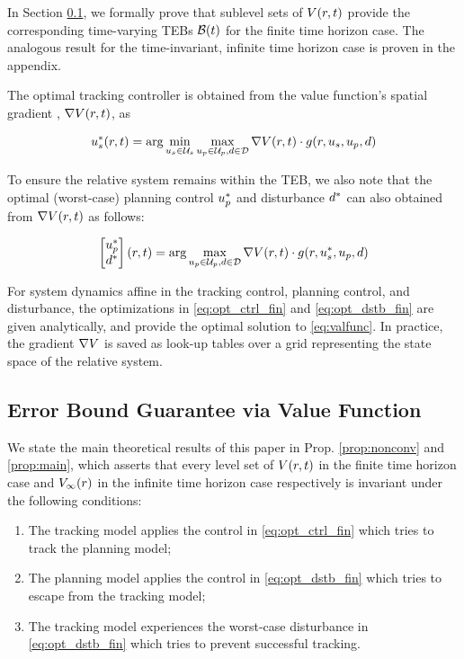 In Section \ref{sec:proofs}, we formally prove that sublevel sets of $V(r,t)$ provide the corresponding time-varying TEBs $\mathcal B(t)$ for the finite time horizon case.
The analogous result for the time-invariant, infinite time horizon case is proven in the appendix.

The optimal tracking controller is obtained from the value function's spatial gradient \cite{Mitchell05, Fisac15, Chen2018}, $\nabla V(r, t)$, as

\begin{align} \label{eq:opt_ctrl_fin}
\tctrl^*(\rstate, \tvar) = \arg\min_{\tctrl\in\tcset} \max_{\pctrl\in\pcset, \dstb\in\dset} \nabla\valfunc(\rstate, \tvar) \cdot \rdyn(\rstate,\tctrl,\pctrl,\dstb)
\end{align}

To ensure the relative system remains within the TEB, we also note that the optimal (worst-case) planning control $u_p^*$ and disturbance $d^*$ can also obtained from $\nabla V(r, t)$ as follows:

\begin{align} \label{eq:opt_dstb_fin}
\begin{bmatrix}
  \pctrl^* \\
  \dstb^*
\end{bmatrix} (\rstate, \tvar) = \arg \max_{\pctrl\in\pcset, \dstb\in\dset} \nabla\valfunc(\rstate, \tvar) \cdot \rdyn(\rstate,\tctrl^*,\pctrl,\dstb)
\end{align}

For system dynamics affine in the tracking control, planning control, and disturbance, the optimizations in \eqref{eq:opt_ctrl_fin} and \eqref{eq:opt_dstb_fin} are given analytically, and provide the optimal solution to \eqref{eq:valfunc}.
In practice, the gradient $\nabla V$ is saved as look-up tables over a grid representing the state space of the relative system.

\subsection{Error Bound Guarantee via Value Function} \label{sec:proofs}
We state the main theoretical results of this paper in Prop. \ref{prop:nonconv} and \ref{prop:main}, which asserts that every level set of $V(r, t)$ in the finite time horizon case and $V_\infty(r)$ in the infinite time horizon case respectively is invariant under the following conditions:
\begin{enumerate}
  \item The tracking model applies the control in \eqref{eq:opt_ctrl_fin} which tries to track the planning model;
  \item The planning model applies the control in \eqref{eq:opt_dstb_fin} which tries to escape from the tracking model; \label{ln:plan}
  \item The tracking model experiences the worst-case disturbance in \eqref{eq:opt_dstb_fin} which tries to prevent successful tracking. \label{ln:dist}
\end{enumerate}

